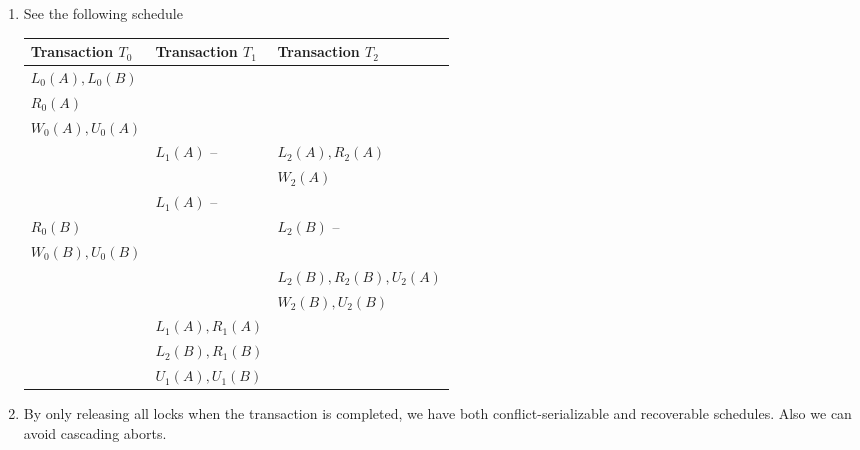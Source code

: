 \documentclass[10pt]{article}
\begin{document}
\begin{enumerate}
		\item See the following schedule
            \begin{center}
                \begin{tabularx}{\linewidth}{Y|Y|Y}
					Transaction $T_0$ & Transaction $T_1$ & Transaction $T_2$ \\ \hline
					$L_0(A), L_0(B)$ & & \\
					$R_0(A)$ & & \\
					$W_0(A), U_0(A)$ & & \\
					& $L_1(A)$ -- \color{red}{DENIED}& $L_2(A), R_2(A)$\\
					& & $W_2(A)$\\
					& $L_1(A)$ -- \color{red}{DENIED}& \\
					$R_0(B)$ &  & $L_2(B)$ -- \color{red}{DENIED}\\
					$W_0(B), U_0(B)$ &  & \\
					&  & $L_2(B), R_2(B), U_2(A)$\\
					&  & $W_2(B), U_2(B)$\\
					& $L_1(A), R_1(A)$ & \\
					& $L_2(B), R_1(B)$ & \\
					& $U_1(A), U_1(B)$ & \\
                \end{tabularx}
            \end{center}

		\item By only releasing all locks when the transaction is completed, we have both conflict-serializable and
			recoverable schedules. Also we can avoid cascading aborts.
	\end{enumerate}

\newpage
\end{document}
